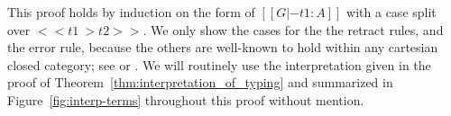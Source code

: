 This proof holds by induction on the form of $[[G |- t1 : A]]$ with a
case split over $<<t1 ~> t2>>$.  We only show the cases for the the
retract rules, and the error rule, because the others are well-known
to hold within any cartesian closed category; see \cite{Lambek:1980}
or \cite{Crole:1994}.  We will routinely use the interpretation given
in the proof of Theorem~\ref{thm:interpretation_of_typing} and
summarized in Figure~\ref{fig:interp-terms} throughout this proof
without mention.



